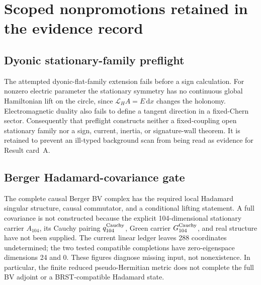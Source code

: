 \documentclass[11pt]{article}
\newcommand{\dd}{\mathrm d}
\begin{document}
\appendix

\section{Scoped nonpromotions retained in the evidence record}
\label{app:nonpromotions}

\subsection{Dyonic stationary-family preflight}

The attempted dyonic-flat-family extension fails before a sign calculation.
For nonzero electric parameter the stationary symmetry has no continuous
global Hamiltonian lift on the circle, since
$\mathcal L_HA=E\,\dd x$ changes the holonomy.  Electromagnetic duality also
fails to define a tangent direction in a fixed-Chern sector.  Consequently
that preflight constructs neither a fixed-coupling open stationary family nor
a sign, current, inertia, or signature-wall theorem.  It is retained to
prevent an ill-typed background scan from being read as evidence for Result
card~A.

\subsection{Berger Hadamard-covariance gate}

The complete causal Berger BV complex has the required local Hadamard
singular structure, causal commutator, and a conditional lifting statement.
A full covariance is not constructed because the explicit 104-dimensional
stationary carrier $A_{104}$, its Cauchy pairing
$q^{\rm Cauchy}_{104}$, Green carrier $G^{\rm Cauchy}_{104}$, and real
structure have not been supplied.  The current linear ledger leaves 288
coordinates undetermined; the two tested compatible completions have
zero-eigenspace dimensions 24 and 0.  These figures diagnose missing input,
not nonexistence.  In particular, the finite reduced pseudo-Hermitian metric
does not complete the full BV adjoint or a BRST-compatible Hadamard state.
\end{document}
